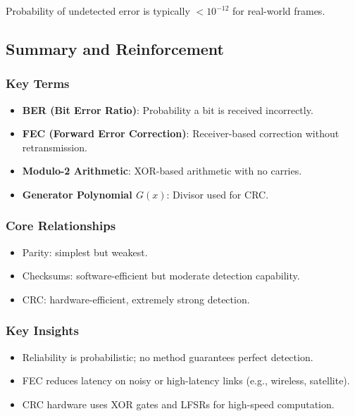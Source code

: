\documentclass[12pt]{article}
\begin{document}
Probability of undetected error is typically $<10^{-12}$ for real-world frames.

\subsection{Summary and Reinforcement}

\subsubsection{Key Terms}

\begin{itemize}
    \item \textbf{BER (Bit Error Ratio)}: Probability a bit is received incorrectly.
    \item \textbf{FEC (Forward Error Correction)}: Receiver-based correction without retransmission.
    \item \textbf{Modulo-2 Arithmetic}: XOR-based arithmetic with no carries.
    \item \textbf{Generator Polynomial $G(x)$}: Divisor used for CRC.
\end{itemize}

\subsubsection{Core Relationships}

\begin{itemize}
    \item Parity: simplest but weakest.
    \item Checksums: software-efficient but moderate detection capability.
    \item CRC: hardware-efficient, extremely strong detection.
\end{itemize}

\subsubsection{Key Insights}

\begin{itemize}
    \item Reliability is probabilistic; no method guarantees perfect detection.
    \item FEC reduces latency on noisy or high-latency links (e.g., wireless, satellite).
    \item CRC hardware uses XOR gates and LFSRs for high-speed computation.
\end{itemize}
\end{document}
